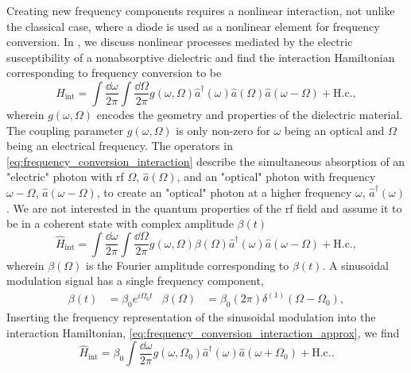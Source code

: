 Creating new frequency components requires a nonlinear interaction, not unlike the classical case, where a diode is used as a nonlinear element for frequency conversion.
In , we discuss nonlinear processes mediated by the electric susceptibility of a nonabsorptive dielectric and find the
interaction Hamiltonian corresponding to frequency conversion to be
\begin{equation}
	\hat{H}_\text{int}
	=
	\int\frac{\dd{\omega}}{2\pi}
	\int\frac{\dd{\Omega}}{2\pi}
	g(\omega,\Omega)
	\hat{a}^\dagger(\omega)
	\hat{a}(\Omega)
	\hat{a}(\omega-\Omega)
	+
	\text{H.c.}
	\label{eq:frequency_conversion_interaction}
	,
\end{equation}
wherein $g(\omega,\Omega)$ encodes the geometry and properties of the dielectric material.
The coupling parameter $g(\omega,\Omega)$ is only non-zero for $\omega$ being an optical and $\Omega$ being an electrical frequency.
The operators in \cref{eq:frequency_conversion_interaction} describe the simultaneous absorption of an "electric" photon with \gls{rf} $\Omega$, $\hat{a}(\Omega)$, and an "optical" photon with frequency $\omega-\Omega$, $\hat{a}(\omega-\Omega)$, to create an "optical" photon at a higher frequency $\omega$, $\hat{a}^\dagger(\omega)$.
We are not interested in the quantum properties of the \gls{rf} field and assume it to be in a coherent state with complex amplitude $\beta(t)$
\begin{equation}
	\hat{H}_\text{int}
	=
	\int\frac{\dd{\omega}}{2\pi}
	\int\frac{\dd{\Omega}}{2\pi}
	g(\omega,\Omega)
	\beta(\Omega)
	\hat{a}^\dagger(\omega)
	\hat{a}(\omega-\Omega)
	+
	\text{H.c.}
	,
	\label{eq:frequency_conversion_interaction_approx}
\end{equation}
wherein $\beta(\Omega)$ is the Fourier amplitude corresponding to $\beta(t)$.
A sinusoidal modulation signal has a single frequency component,
\begin{align}
	\beta(t)
	&=
	\beta_0
	e^{i\Omega_0t}
	&
	\beta(\Omega)
	&=
	\beta_0
	(2\pi)
	\delta^{(1)}(\Omega-\Omega_0)
	,
\end{align}
Inserting the frequency representation of the sinusoidal modulation into the interaction Hamiltonian, \cref{eq:frequency_conversion_interaction_approx}, we find
\begin{equation}
	\hat{H}_\text{int}
	=
	\beta_0
	\int\frac{\dd{\omega}}{2\pi}
	g(\omega,\Omega_0)
	\hat{a}^\dagger(\omega)
	\hat{a}(\omega+\Omega_0)
	+
	\text{H.c.}
	\label{eq:frequency_conversion_interaction_sinusoidal}
	.
\end{equation}

